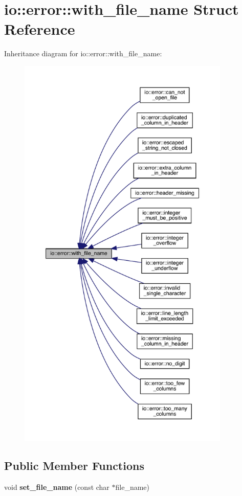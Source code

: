 \hypertarget{structio_1_1error_1_1with__file__name}{}\section{io\+:\+:error\+:\+:with\+\_\+file\+\_\+name Struct Reference}
\label{structio_1_1error_1_1with__file__name}


Inheritance diagram for io\+:\+:error\+:\+:with\+\_\+file\+\_\+name\+:
\nopagebreak
\begin{figure}[H]
\begin{center}
\leavevmode
\includegraphics[height=550pt]{structio_1_1error_1_1with__file__name__inherit__graph}
\end{center}
\end{figure}
\subsection*{Public Member Functions}
\begin{DoxyCompactItemize}
\item 
void {\bfseries set\+\_\+file\+\_\+name} (const char $\ast$file\+\_\+name)\hypertarget{structio_1_1error_1_1with__file__name_ae765de62778c989d4658b4efe2995390}{}\label{structio_1_1error_1_1with__file__name_ae765de62778c989d4658b4efe2995390}

\end{DoxyCompactItemize}
